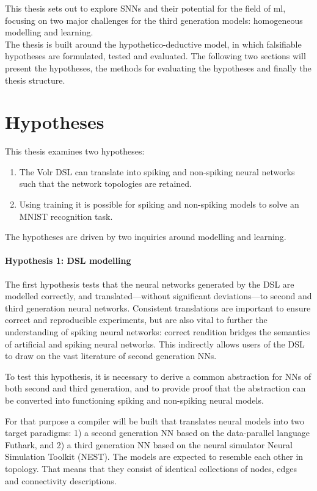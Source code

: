 This thesis sets out to explore \glspl{SNN} and their potential for the 
field of \gls{ml}, focusing on two major challenges for the
third generation models: homogeneous modelling and learning.
\\[0.1cm]

The thesis is built around the hypothetico-deductive model, in which 
falsifiable hypotheses are formulated, tested and evaluated.
The following two sections will present the hypotheses, the methods for
evaluating the hypotheses and finally the thesis structure.

\section{Hypotheses} \label{sec:hypotheses}
This thesis examines two hypotheses:

\begin{enumerate}
  \item The Volr DSL can translate into spiking and non-spiking neural networks such that the network topologies are retained.
  \item Using training it is possible for spiking and non-spiking models to solve an MNIST recognition task.
\end{enumerate}

The hypotheses are driven by two inquiries around modelling and learning.

\paragraph{Hypothesis 1: DSL modelling}
The first hypothesis tests that the neural networks generated by the DSL are
modelled correctly, and translated---without significant
deviations---to second and third generation neural networks.
Consistent translations are important to ensure correct and reproducible experiments,
but are also vital to further the understanding of spiking neural networks:
correct rendition bridges the semantics of artificial and spiking neural networks.
This indirectly allows users of the DSL to draw on the vast literature of
second generation \gls{NN}s.

To test this hypothesis, it is necessary to derive a common abstraction for
\glspl{NN} of both second and third generation, and to provide proof that the
abstraction can be converted into functioning spiking and non-spiking neural
models.

For that purpose a compiler will be built that translates neural models
into two target paradigms:
  1) a second generation \gls{NN} based on the data-parallel language Futhark, and
  2) a third generation \gls{NN} based on the neural simulator Neural Simulation
  Toolkit (NEST).
  The models are expected to resemble each other in topology. 
That means that they consist of identical collections of nodes, edges
and connectivity descriptions.

